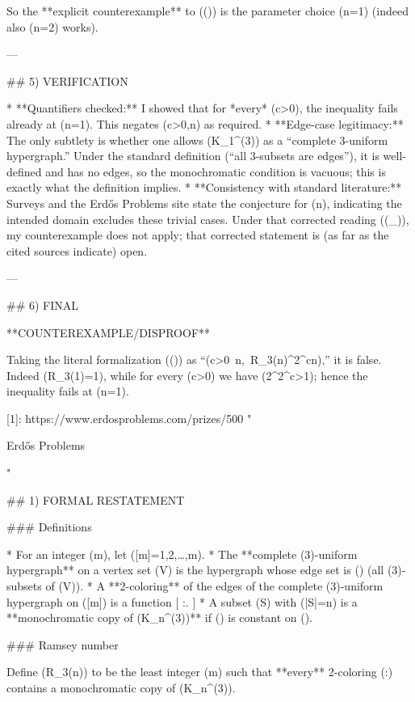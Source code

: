 So the **explicit counterexample** to ((\star)) is the parameter choice (n=1) (indeed also (n=2) works).

---

## 5) VERIFICATION

* **Quantifiers checked:** I showed that for *every* (c>0), the inequality fails already at (n=1). This negates (\exists c>0,\forall n) as required.
* **Edge-case legitimacy:** The only subtlety is whether one allows (K_1^{(3)}) as a “complete 3-uniform hypergraph.” Under the standard definition (“all 3-subsets are edges”), it is well-defined and has no edges, so the monochromatic condition is vacuous; this is exactly what the definition implies.
* **Consistency with standard literature:** Surveys and the Erdős Problems site state the conjecture for (n), indicating the intended domain excludes these trivial cases. 
  Under that corrected reading ((\star_{})), my counterexample does not apply; that corrected statement is (as far as the cited sources indicate) open.

---

## 6) FINAL

**COUNTEREXAMPLE/DISPROOF**

Taking the literal formalization ((\star)) as “(\exists c>0\ \forall n,\ R_3(n)^{2^{cn}}),” it is false.
Indeed (R_3(1)=1), while for every (c>0) we have (2^{2^{c}}>1); hence the inequality fails at (n=1).

[1]: https://www.erdosproblems.com/prizes/500 "
  
    Erdős Problems
  
"

## 1) FORMAL RESTATEMENT

### Definitions

* For an integer (m), let ([m]={1,2,\dots,m}).
* The **complete (3)-uniform hypergraph** on a vertex set (V) is the hypergraph whose edge set is () (all (3)-subsets of (V)).
* A **2-coloring** of the edges of the complete (3)-uniform hypergraph on ([m]) is a function
  [
  \chi:.
  ]
* A subset (S\subseteq [m]) with (|S|=n) is a **monochromatic copy of (K_n^{(3)})** if (\chi) is constant on ().

### Ramsey number

Define (R_3(n)) to be the least integer (m) such that **every** 2-coloring (\chi:) contains a monochromatic copy of (K_n^{(3)}).

